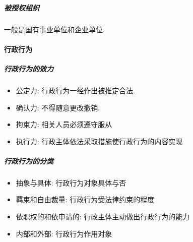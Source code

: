 \subparagraph{被授权组织} 一般是国有事业单位和企业单位.

\paragraph{行政行为}

\subparagraph{行政行为的效力}

\begin{itemize}
	\item 公定力: 行政行为一经作出被推定合法.
	\item 确认力: 不得随意更改撤销.
	\item 拘束力: 相关人员必须遵守服从
	\item 执行力: 行政主体依法采取措施使行政行为的内容实现
\end{itemize}

\subparagraph{行政行为的分类}

\begin{itemize}
	\item 抽象与具体: 行政行为对象具体与否
	\item 羁束和自由裁量: 行政行为受法律约束的程度
	\item 依职权的和依申请的: 行政主体主动做出行政行为的能力
	\item 内部和外部: 行政行为作用对象
\end{itemize}



